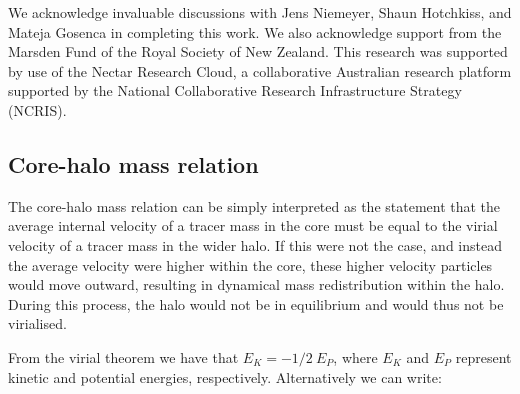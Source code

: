 \documentclass[a4paper,11pt]{article}
\begin{document}

\acknowledgments

We acknowledge invaluable discussions with Jens Niemeyer, Shaun Hotchkiss, and Mateja Gosenca in completing this work. We also acknowledge support from the Marsden Fund of the Royal Society of New Zealand. This research was supported by use of the Nectar Research Cloud, a collaborative Australian research platform supported by the National Collaborative Research Infrastructure Strategy (NCRIS).



 


\begin{appendices}
\section{Core-halo mass relation}\label{app:core-halo}

The core-halo mass relation can be simply interpreted as the statement that the average internal velocity of a tracer mass in the core must be equal to the virial velocity of a tracer mass in the wider halo. If this were not the case, and instead the average velocity were higher within the core, these higher velocity particles would move outward, resulting in dynamical mass redistribution within the halo. During this process, the halo would not be in equilibrium and would thus not be virialised.

From the virial theorem we have that $E_K=-1/2 \ E_P$, where $E_K$ and $E_P$ represent kinetic and potential energies, respectively. Alternatively we can write:


\end{appendices}
\end{document}
